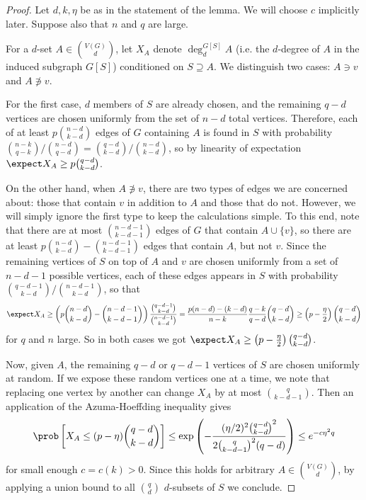 \documentclass[11pt]{article}
\begin{document}
\begin{proof}
    Let $d,k,\eta$ be as in the statement of the lemma. We will choose $c$ implicitly later. Suppose also that $n$ and $q$ are large.
    
    For a $d$-set $A\in\binom{V(G)}{d}$, let $X_A$ denote $\deg_d^{G[S]}A$ (i.e. the $d$-degree of $A$ in the induced subgraph $G[S]$) conditioned on $S\supseteq A$. We distinguish two cases: $A\ni v$ and $A\not\ni v$.

    For the first case, $d$ members of $S$ are already chosen, and the remaining $q-d$ vertices are chosen uniformly from the set of $n-d$ total vertices. Therefore, each of at least $p\binom{n-d}{k-d}$ edges of $G$ containing $A$ is found in $S$ with probability $\binom{n-k}{q-k}/\binom{n-d}{q-d}=\binom{q-d}{k-d}/\binom{n-d}{k-d}$, so by linearity of expectation $\expect X_A\ge p\binom{q-d}{k-d}$.

    On the other hand, when $A\not\ni v$, there are two types of edges we are concerned about: those that contain $v$ in addition to $A$ and those that do not. However, we will simply ignore the first type to keep the calculations simple. To this end, note that there are at most $\binom{n-d-1}{k-d-1}$ edges of $G$ that contain $A\cup\{v\}$, so there are at least $p\binom{n-d}{k-d}-\binom{n-d-1}{k-d-1}$ edges that contain $A$, but not $v$. Since the remaining vertices of $S$ on top of $A$ and $v$ are chosen uniformly from a set of $n-d-1$ possible vertices, each of these edges appears in $S$ with probability $\binom{q-d-1}{k-d}/\binom{n-d-1}{k-d}$, so that
    $$\expect X_A\ge \left(p\binom{n-d}{k-d}-\binom{n-d-1}{k-d-1}\right)\frac{\binom{q-d-1}{k-d}}{\binom{n-d-1}{k-d}}=\frac{p(n-d)-(k-d)}{n-k }\frac{q-k }{q-d }\binom{q-d}{k-d}\ge \left(p-\frac{\eta}{2}\right)\binom{q-d}{k-d}$$
    for $q$ and $n$ large. So in both cases we got $\expect X_A\ge\left(p-\frac{\eta}{2}\right)\binom{q-d}{k-d}$.

    Now, given $A$, the remaining $q-d$ or $q-d-1$ vertices of $S$ are chosen uniformly at random. If we expose these random vertices one at a time, we note that replacing one vertex by another can change $X_A$ by at most $\binom{q}{k-d-1}$. Then an application of the Azuma-Hoeffding inequality gives
    $$\prob\left[X_A\le (p-\eta)\binom{q-d}{k-d}\right]\le \exp\left(-\frac{(\eta/2)^2\binom{q-d}{k-d}^2}{2\binom{q}{k-d-1}^2(q-d)}\right)\le e^{-c\eta^2q}$$
    for small enough $c=c(k)>0$. Since this holds for arbitrary $A\in\binom{V(G)}{d}$, by applying a union bound to all $\binom{q}{d}$ $d$-subsets of $S$ we conclude.
\end{proof}
\end{document}
